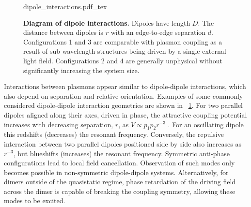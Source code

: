 \documentclass{article}
\begin{document}
\begin{figure}
\vspace{-10pt}
\fontsize{10pt}{1em}\selectfont
\def\svgwidth{\textwidth}
{dipole_interactions.pdf_tex}
\caption[Diagram of dipole interactions]{\textbf{Diagram of dipole interactions.} Dipoles have length $D$. The distance between dipoles is $r$ with an edge-to-edge separation $d$. Configurations 1 and 3 are comparable with plasmon coupling as a result of sub-wavelength structures being driven by a single external light field. Configurations 2 and 4 are generally unphysical without significantly increasing the system size.}
\label{fig:dipole_interactions}
\vspace{-5pt}
\end{figure}

Interactions between plasmons appear similar to dipole-dipole interactions, which also depend on separation and relative orientation. Examples of some commonly considered dipole-dipole interaction geometries are shown in \figurename~\ref{fig:dipole_interactions}. For two parallel dipoles aligned along their axes, driven in phase, the attractive coupling potential increases with decreasing separation, $r$, as $V \propto p_1p_2r^{-3}$ \cite{halas2011}. For an oscillating dipole this redshifts (decreases) the resonant frequency. Conversely, the repulsive interaction between two parallel dipoles positioned side by side also increases as $r^{-3}$, but blueshifts (increases) the resonant frequency. Symmetric anti-phase configurations lead to local field cancellation. Observation of such modes only becomes possible in non-symmetric dipole-dipole systems. Alternatively, for dimers outside of the quasistatic regime, phase retardation of the driving field across the dimer is capable of breaking the coupling symmetry, allowing these modes to be excited.
\end{document}
